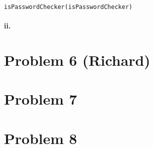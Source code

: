\documentclass[10pt,letter]{article}
\begin{document}
\texttt{isPasswordChecker(isPasswordChecker)}

\paragraph{ii.} 

\section*{Problem 6 (Richard)}

\section*{Problem 7}
\section*{Problem 8}
\end{document}
